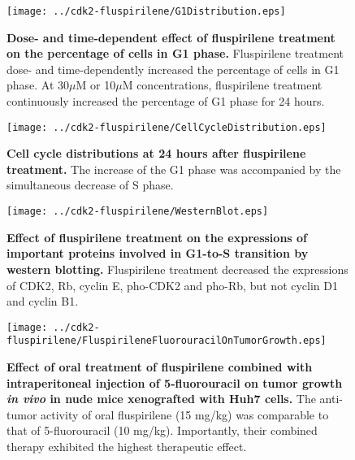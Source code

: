 \documentclass[10pt]{article}
\begin{document}
\begin{figure}
\begin{center}
\texttt{[image: ../cdk2-fluspirilene/G1Distribution.eps]}
\end{center}
\caption{
{\bf Dose- and time-dependent effect of fluspirilene treatment on the percentage of cells in G1 phase.} Fluspirilene treatment dose- and time-dependently increased the percentage of cells in G1 phase. At 30$\mu$M or 10$\mu$M concentrations, fluspirilene treatment continuously increased the percentage of G1 phase for 24 hours.
}
\label{G1Distribution}
\end{figure}

\begin{figure}
\begin{center}
\texttt{[image: ../cdk2-fluspirilene/CellCycleDistribution.eps]}
\end{center}
\caption{
{\bf Cell cycle distributions at 24 hours after fluspirilene treatment.} The increase of the G1 phase was accompanied by the simultaneous decrease of S phase.
}
\label{CellCycleDistribution}
\end{figure}

\begin{figure}
\begin{center}
\texttt{[image: ../cdk2-fluspirilene/WesternBlot.eps]}
\end{center}
\caption{
{\bf Effect of fluspirilene treatment on the expressions of important proteins involved in G1-to-S transition by western blotting.} Fluspirilene treatment decreased the expressions of CDK2, Rb, cyclin E, pho-CDK2 and pho-Rb, but not cyclin D1 and cyclin B1.
}
\label{WesternBlot}
\end{figure}

\begin{figure}
\begin{center}
\texttt{[image: ../cdk2-fluspirilene/FluspirileneFluorouracilOnTumorGrowth.eps]}
\end{center}
\caption{
{\bf Effect of oral treatment of fluspirilene combined with intraperitoneal injection of 5-fluorouracil on tumor growth \textit{in vivo} in nude mice xenografted with Huh7 cells.} The anti-tumor activity of oral fluspirilene (15 mg/kg) was comparable to that of 5-fluorouracil (10 mg/kg). Importantly, their combined therapy exhibited the highest therapeutic effect.
}
\label{FluspirileneFluorouracilOnTumorGrowth}
\end{figure}
\end{document}
